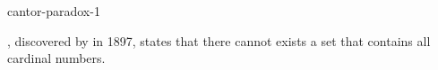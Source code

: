 \documentclass{stex}
\begin{document}
\begin{smodule}{cantor-paradox-1}
\begin{sparagraph}[style=symdoc]
  , discovered by  in 1897, states that there cannot exists a set that contains all cardinal numbers.
\end{sparagraph}
\end{smodule}
\end{document}
